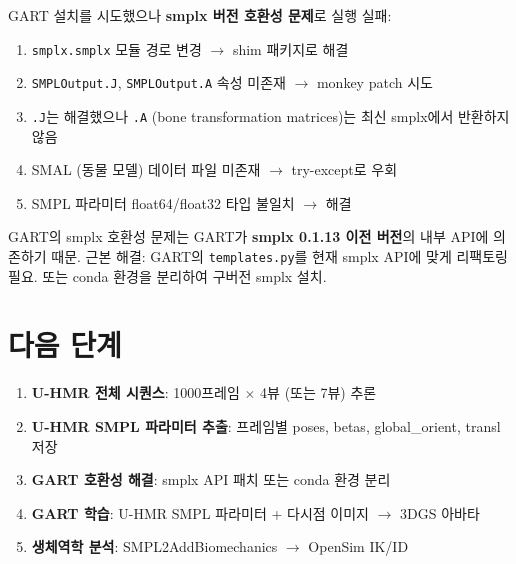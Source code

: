 \documentclass[11pt, a4paper]{report}
\begin{document}
GART 설치를 시도했으나 \textbf{smplx 버전 호환성 문제}로 실행 실패:

\begin{enumerate}[leftmargin=*]
  \item \texttt{smplx.smplx} 모듈 경로 변경 $\rightarrow$ shim 패키지로 해결
  \item \texttt{SMPLOutput.J}, \texttt{SMPLOutput.A} 속성 미존재 $\rightarrow$ monkey patch 시도
  \item \texttt{.J}는 해결했으나 \texttt{.A} (bone transformation matrices)는 최신 smplx에서 반환하지 않음
  \item SMAL (동물 모델) 데이터 파일 미존재 $\rightarrow$ try-except로 우회
  \item SMPL 파라미터 float64/float32 타입 불일치 $\rightarrow$ 해결
\end{enumerate}

\begin{warningbox}
GART의 smplx 호환성 문제는 GART가 \textbf{smplx 0.1.13 이전 버전}의 내부 API에 의존하기 때문.
근본 해결: GART의 \texttt{templates.py}를 현재 smplx API에 맞게 리팩토링 필요.
또는 conda 환경을 분리하여 구버전 smplx 설치.
\end{warningbox}


\chapter{다음 단계}

\begin{enumerate}[leftmargin=*]
  \item \textbf{U-HMR 전체 시퀀스}: 1000프레임 $\times$ 4뷰 (또는 7뷰) 추론
  \item \textbf{U-HMR SMPL 파라미터 추출}: 프레임별 poses, betas, global\_orient, transl 저장
  \item \textbf{GART 호환성 해결}: smplx API 패치 또는 conda 환경 분리
  \item \textbf{GART 학습}: U-HMR SMPL 파라미터 + 다시점 이미지 $\rightarrow$ 3DGS 아바타
  \item \textbf{생체역학 분석}: SMPL2AddBiomechanics $\rightarrow$ OpenSim IK/ID
\end{enumerate}
\end{document}
